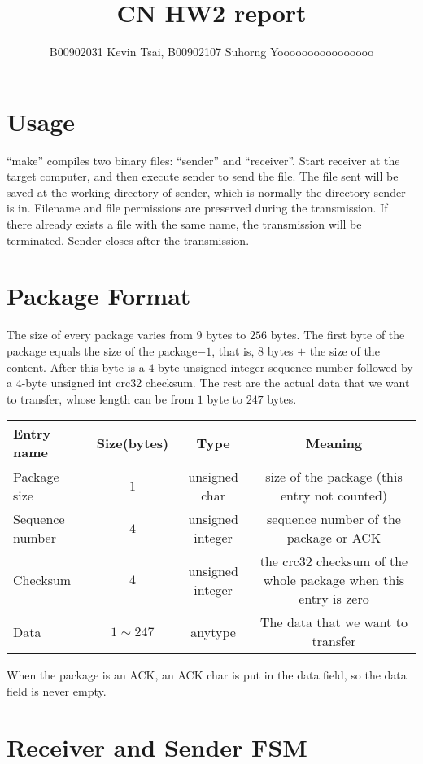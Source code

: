 \documentclass[10pt,a4paper]{article}
\author{B00902031 Kevin Tsai, B00902107 Suhorng Yoooooooooooooooo}
\title{CN HW2 report}
\begin{document}
\maketitle

\section{Usage}
    ``make'' compiles two binary files: ``sender'' and ``receiver''. Start receiver at the target computer, and then execute sender to send the file. The file sent will be saved at the working directory of sender, which is normally the directory sender is in. Filename and file permissions are preserved during the transmission. If there already exists a file with the same name, the transmission will be terminated. Sender closes after the transmission.

\section{Package Format}
    The size of every package varies from $9$ bytes to $256$ bytes. The first byte of the package equals the size of the package$ - 1$, that is, $8$ bytes $+$ the size of the content. After this byte is a $4$-byte unsigned integer sequence number followed by a $4$-byte unsigned int crc32 checksum. The rest are the actual data that we want to transfer, whose length can be from $1$ byte to $247$ bytes.

\begin{center}
    \begin{tabular}{lccc}
        Entry name & Size(bytes) & Type & Meaning\\
            \hline
        Package size & $1$ & unsigned char &  size of the package (this entry not counted)\\ 
        Sequence number & $4$ & unsigned integer & sequence number of the package or ACK\\
        Checksum & $4$ & unsigned integer & the crc32 checksum of the whole package when this entry is zero\\
        Data & $1 \sim 247$ & anytype & The data that we want to transfer\\
    \end{tabular}
\end{center}

    When the package is an ACK, an ACK char is put in the data field, so the data field is never empty.

\section{Receiver and Sender FSM}
\end{document}
